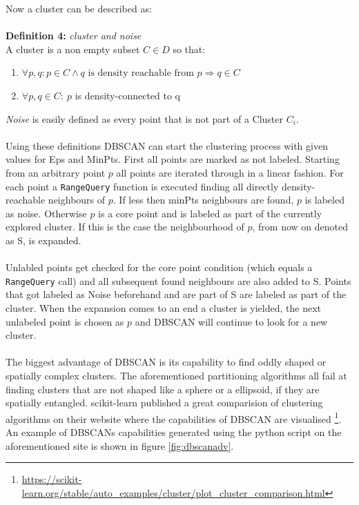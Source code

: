 Now a cluster can be described as:\\
\ \\
\textbf{Definition 4:} \textit{cluster and noise}\\
A cluster is a non empty subset $C \in D$ so that:
\begin{enumerate}
    \item $\forall p, q: p \in C \wedge q \text{ is density reachable from } p \Rightarrow q \in C$
    \item $\forall p, q \in C: \ p$ is density-connected to q
\end{enumerate}
\textit{Noise} is easily defined as every point that is not part of a Cluster $C_i$.\\
\ \\
Using these definitions DBSCAN can start the clustering process with given values for Eps and MinPts. First all points are marked as not labeled. Starting from an arbitrary point $p$ all points are iterated through in a linear fashion. For each point a \texttt{RangeQuery} function is executed finding all directly density-reachable neighbours of $p$. If less then minPts neighbours are found, $p$ is labeled as noise. Otherwise $p$ is a core point and is labeled as part of the currently explored cluster. If this is the case the neighbourhood of $p$, from now on denoted as S, is expanded.\\
\ \\
Unlabled points get checked for the core point condition (which equals a \texttt{RangeQuery} call) and all subsequent found neighbours are also added to S. Points that got labeled as Noise beforehand and are part of S are labeled as part of the cluster.
When the expansion comes to an end a cluster is yielded, the next unlabeled point is chosen as $p$ and DBSCAN will continue to look for a new cluster.\\
\ \\
The biggest advantage of DBSCAN is its capability to find oddly shaped or spatially complex clusters. The aforementioned partitioning algorithms all fail at finding clusters that are not shaped like a sphere or a ellipsoid, if they are spatially entangled. scikit-learn published a great comparision of clustering algorithms on their website where the capabilities of DBSCAN are visualised \footnote{\url{https://scikit-learn.org/stable/auto_examples/cluster/plot_cluster_comparison.html}}. An example of DBSCANs capabilities generated using the python script on the aforementioned site is shown in figure \ref{fig:dbscanadv}.\\

